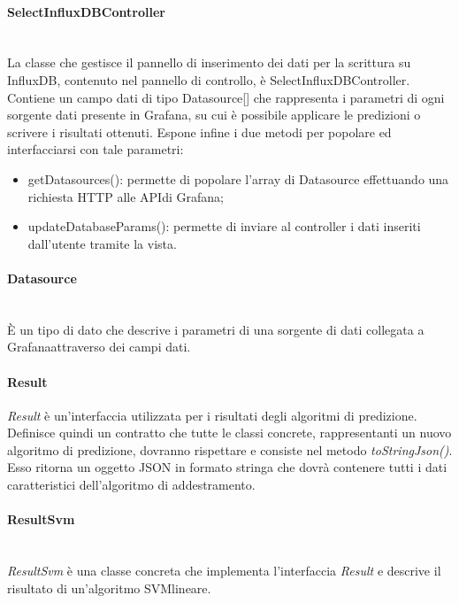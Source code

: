 \paragraph*{SelectInfluxDBController} \mbox{}\\ [1mm]
La classe che gestisce il pannello di inserimento dei dati per la scrittura su InfluxDB, contenuto nel pannello di controllo, è SelectInfluxDBController.
Contiene un campo dati di tipo Datasource[] che rappresenta i parametri di ogni sorgente dati presente in Grafana\glosp, su cui è possibile applicare le predizioni o scrivere i risultati ottenuti. Espone infine i due metodi per popolare ed interfacciarsi con tale parametri:
\begin{itemize}
	\item getDatasources(): permette di popolare l'array di Datasource effettuando una richiesta HTTP alle API\glosp di Grafana\glo;
	\item updateDatabaseParams(): permette di inviare al controller i dati inseriti dall'utente tramite la vista.
\end{itemize}
\paragraph*{Datasource} \mbox{}\\ [1mm]
È un tipo di dato che descrive i parametri di una sorgente di dati collegata a Grafana\glosp attraverso dei campi dati.
\paragraph*{Result}
\textit{Result} è un'interfaccia utilizzata per i risultati degli algoritmi di predizione. Definisce quindi un contratto che tutte le classi concrete, rappresentanti un nuovo algoritmo di predizione, dovranno rispettare e consiste nel metodo \textit{toStringJson()}. Esso ritorna un oggetto JSON in formato stringa che dovrà contenere tutti i dati caratteristici dell'algoritmo di addestramento.
\paragraph*{ResultSvm} \mbox{}\\ [1mm]
\textit{ResultSvm} è una classe concreta che implementa l'interfaccia \textit{Result} e descrive il risultato di un'algoritmo SVM\glosp lineare.
